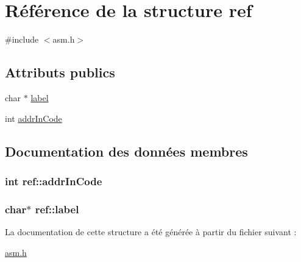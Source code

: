 \hypertarget{structref}{}\section{Référence de la structure ref}
\label{structref}


{\ttfamily \#include $<$asm.\+h$>$}

\subsection*{Attributs publics}
\begin{DoxyCompactItemize}
\item 
char $\ast$ \hyperlink{structref_a1f034634ee71b9c4421efe009de3a159}{label}
\item 
int \hyperlink{structref_aab92a178c6f40703ef8a5a18cc2ba81d}{addr\+In\+Code}
\end{DoxyCompactItemize}


\subsection{Documentation des données membres}
\subsubsection[{\texorpdfstring{addr\+In\+Code}{addrInCode}}]{\setlength{\rightskip}{0pt plus 5cm}int ref\+::addr\+In\+Code}\hypertarget{structref_aab92a178c6f40703ef8a5a18cc2ba81d}{}\label{structref_aab92a178c6f40703ef8a5a18cc2ba81d}
\subsubsection[{\texorpdfstring{label}{label}}]{\setlength{\rightskip}{0pt plus 5cm}char$\ast$ ref\+::label}\hypertarget{structref_a1f034634ee71b9c4421efe009de3a159}{}\label{structref_a1f034634ee71b9c4421efe009de3a159}


La documentation de cette structure a été générée à partir du fichier suivant \+:\begin{DoxyCompactItemize}
\item 
\hyperlink{asm_8h}{asm.\+h}\end{DoxyCompactItemize}
